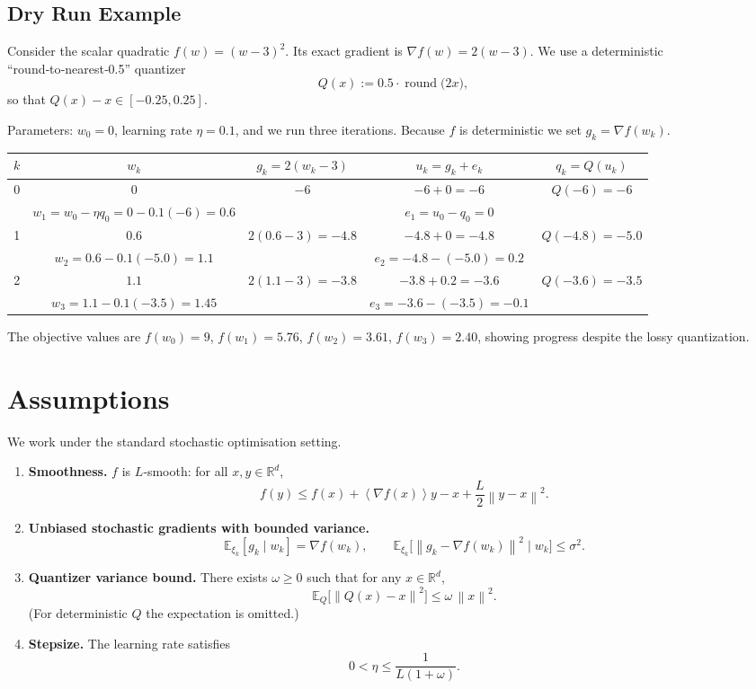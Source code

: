 \documentclass{article}
\newcommand{\E}{\mathbb{E}}
\newcommand{\R}{\mathbb{R}}
\newcommand{\norm}[1]{\left\|#1\right\|}
\newcommand{\inner}[1]{\left\langle#1\right\rangle}
\begin{document}
\subsection*{Dry Run Example}
Consider the scalar quadratic $f(w)=(w-3)^2$.
Its exact gradient is $\nabla f(w)=2(w-3)$.  
We use a deterministic ``round‑to‑nearest‑0.5'' quantizer
\[
Q(x):=0.5\cdot\operatorname{round}\!\bigl(2x\bigr),
\]
so that $Q(x)-x\in[-0.25,0.25]$.

Parameters: $w_0=0$, learning rate $\eta=0.1$, and we run three iterations.
Because $f$ is deterministic we set $g_k=\nabla f(w_k)$.

\begin{center}
\begin{tabular}{c|c|c|c|c}
$k$ & $w_k$ & $g_k=2(w_k-3)$ & $u_k=g_k+e_k$ & $q_k=Q(u_k)$ \\ \hline
0 & $0$   & $-6$ & $-6+0=-6$ & $Q(-6)=-6$ \\[2mm]
  & $w_1=w_0-\eta q_0=0-0.1(-6)=0.6$ &  & $e_1=u_0-q_0=0$ &  \\ \hline
1 & $0.6$ & $2(0.6-3)=-4.8$ & $-4.8+0=-4.8$ & $Q(-4.8)=-5.0$ \\[2mm]
  & $w_2=0.6-0.1(-5.0)=1.1$ &  & $e_2=-4.8-(-5.0)=0.2$ &  \\ \hline
2 & $1.1$ & $2(1.1-3)=-3.8$ & $-3.8+0.2=-3.6$ & $Q(-3.6)=-3.5$ \\[2mm]
  & $w_3=1.1-0.1(-3.5)=1.45$ &  & $e_3=-3.6-(-3.5)=-0.1$ &  \\ \hline
\end{tabular}
\end{center}
The objective values are $f(w_0)=9$, $f(w_1)=5.76$, $f(w_2)=3.61$, $f(w_3)=2.40$,
showing progress despite the lossy quantization.

\section*{Assumptions}
We work under the standard stochastic optimisation setting.

\begin{enumerate}[label=(A\arabic*)]
\item \textbf{Smoothness.} $f$ is $L$‑smooth: for all $x,y\in\R^{d}$,
\[
f(y)\le f(x)+\inner{\nabla f(x)}{y-x}+\frac{L}{2}\norm{y-x}^2 .\tag{A1}
\]

\item \textbf{Unbiased stochastic gradients with bounded variance.}
\[
\E_{\xi_k}[g_k\mid w_k]=\nabla f(w_k),\qquad
\E_{\xi_k}\bigl[\norm{g_k-\nabla f(w_k)}^2\mid w_k\bigr]\le\sigma^2 .\tag{A2}
\]

\item \textbf{Quantizer variance bound.} There exists $\omega\ge0$ such that
for any $x\in\R^{d}$,
\[
\E_{Q}\!\bigl[\norm{Q(x)-x}^2\bigr]\le\omega\,\norm{x}^2 .\tag{A3}
\]
(For deterministic $Q$ the expectation is omitted.)

\item \textbf{Stepsize.} The learning rate satisfies
\[
0<\eta\le\frac{1}{L(1+\omega)} .\tag{A4}
\]
\end{enumerate}
\end{document}
